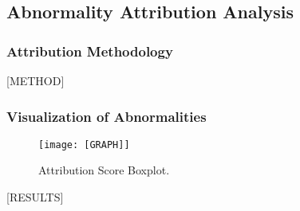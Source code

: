 \subsection{Abnormality Attribution Analysis}

\subsubsection{Attribution Methodology}

[METHOD]

\subsubsection{Visualization of Abnormalities}

\begin{figure}[H]
    \centering
    \vspace{-1.5cm}
    \texttt{[image: [GRAPH]]}
    \caption{Attribution Score Boxplot.}
\end{figure}

[RESULTS]
